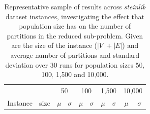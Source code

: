 \documentclass[preprint]{elsarticle}
\begin{document}
\begin{table}[h!]
\centering
\caption[Size of reduced sub-problem results]{Representative sample of results across \emph{steinlib} dataset instances, investigating the effect that population size has on the number of partitions in the reduced sub-problem. Given are the size of the instance (\(|V|+|E|\)) and average number of partitions and standard deviation over 30 runs for population sizes 50, 100, 1,500 and 10,000.}\label{tab:stpg:pop:trunc} 
\begin{adjustbox}{width=0.9\textwidth}
\begin{tabular}{lrrrrrrrrr} \toprule
 &  & \multicolumn{2}{c}{50} & \multicolumn{2}{c}{100} & \multicolumn{2}{c}{1,500} & \multicolumn{2}{c}{10,000}\\
\cmidrule(lr){3-4} \cmidrule(lr){5-6} \cmidrule(lr){7-8} \cmidrule(lr){9-10} 
Instance & size & \multicolumn{1}{c}{\(\mu\)}&\multicolumn{1}{c}{\(\sigma\)} & \multicolumn{1}{c}{\(\mu\)}&\multicolumn{1}{c}{\(\sigma\)}& \multicolumn{1}{c}{\(\mu\)}&\multicolumn{1}{c}{\(\sigma\)} & \multicolumn{1}{c}{\(\mu\)}&\multicolumn{1}{c}{\(\sigma\)}\\ \midrule
%

%
\bottomrule
\end{tabular}
\end{adjustbox}
\end{table}
\end{document}
